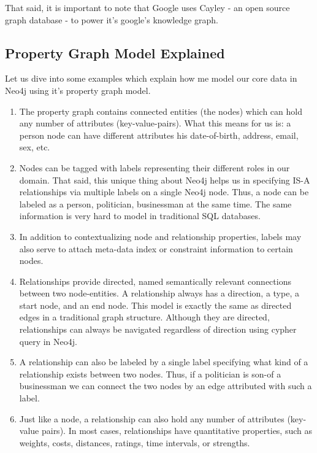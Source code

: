 That said, it is important to note that Google uses Cayley - an open source graph database -  to power it's google's knowledge graph.\cite{cayley} 


\subsection{Property Graph Model Explained}

Let us dive into some examples which explain how me model our core data in Neo4j using it's property graph model.\cite{neogdb}  \\

\begin{enumerate}

\item The property graph contains connected entities (the nodes) which can hold any number of attributes (key-value-pairs). What this means for us is: a person node can have different attributes his date-of-birth, address, email, sex, etc.

\item Nodes can be tagged with labels representing their different roles in our domain. That said, this unique thing about Neo4j helps us in specifying IS-A relationships via multiple labels on a single Neo4j node. Thus, a node can be labeled as a person, politician, businessman at the same time. The same information is very hard to model in traditional SQL databases.

\item In addition to contextualizing node and relationship properties, labels may also serve to attach meta-data index or constraint information to certain nodes.

\item Relationships provide directed, named semantically relevant connections between two node-entities. A relationship always has a direction, a type, a start node, and an end node. This model is exactly the same as directed edges in a traditional graph structure. Although they are directed, relationships can always be navigated regardless of direction using cypher query in Neo4j.

\item A relationship can also be labeled by a single label specifying what kind of a relationship exists between two nodes. Thus, if a politician is son-of a businessman we can connect the two nodes by an edge attributed with such a label.

\item Just like a node, a relationship can also hold any number of attributes (key-value pairs). In most cases, relationships have quantitative properties, such as weights, costs, distances, ratings, time intervals, or strengths. 


\end{enumerate}
